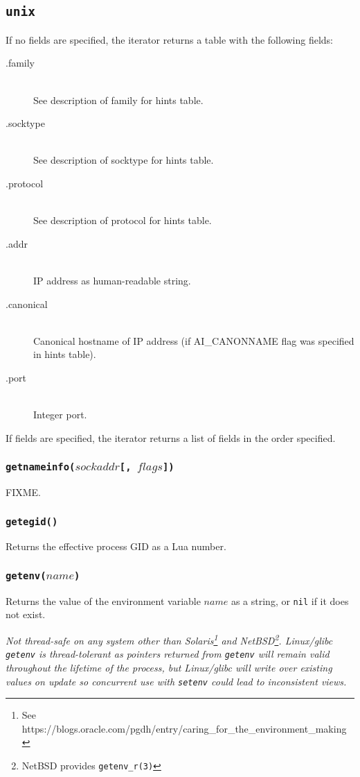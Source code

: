 \documentclass[11pt, oneside]{memoir}
\newcommand*{\nil}[0]{\texttt{nil}\xspace}
\newcommand*{\syscall}[1]{\texttt{#1}\xspace}
\newcommand*{\fn}[1]{\texttt{#1}\xspace}
\newcounter{toccols}
\newenvironment{Module}[1]{
	\subsection{\texttt{#1}}
	\addtocontents{toc}{
		\protect\begin{multicols}{\value{toccols}}
	}
}{
	\addtocontents{toc}{\protect\end{multicols}}
}
\begin{document}
\begin{Module}{unix}
If no fields are specified, the iterator returns a table with the following fields:

\begin{description}
\item[.family] \hfill \\
See description of family for hints table.
\item[.socktype] \hfill \\
See description of socktype for hints table.
\item[.protocol] \hfill \\
See description of protocol for hints table. 
\item[.addr] \hfill \\
IP address as human-readable string.
\item[.canonical] \hfill \\
Canonical hostname of IP address (if AI\_CANONNAME flag was specified in hints table).
\item[.port] \hfill \\
Integer port.
\end{description}

If fields are specified, the iterator returns a list of fields in the order specified.

\subsubsection[\fn{getnameinfo}]{\fn{getnameinfo($sockaddr$[, $flags$])}}

FIXME.

\subsubsection[\fn{getegid}]{\fn{getegid()}}

Returns the effective process GID as a Lua number.

\subsubsection[\fn{getenv}]{\fn{getenv($name$)}}

Returns the value of the environment variable $name$ as a string, or \nil if it does not exist.

\emph{Not thread-safe on any system other than Solaris\footnote{See https://blogs.oracle.com/pgdh/entry/caring\_for\_the\_environment\_making} and NetBSD\footnote{NetBSD provides \syscall{getenv\_r(3)}}. Linux/glibc \fn{getenv} is thread-tolerant as pointers returned from \syscall{getenv} will remain valid throughout the lifetime of the process, but Linux/glibc will write over existing values on update so concurrent use with \fn{setenv} could lead to inconsistent views.}


\end{Module}
\end{document}

